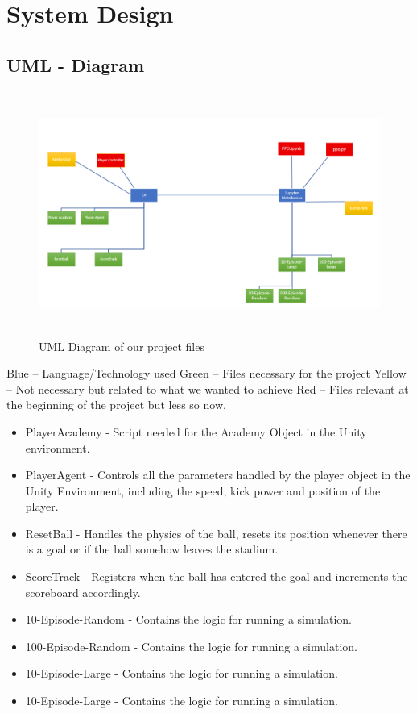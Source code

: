 
\chapter{System Design}

\section{UML - Diagram}

\begin{figure}[H]
    \centering
    \includegraphics[width=130mm, height=80mm]{img/UML.PNG}
    \caption{UML Diagram of our project files}
    \label{fig:uml}
\end{figure}

Blue – Language/Technology used \newline
Green – Files necessary for the project \newline
Yellow – Not necessary but related to what we wanted to achieve \newline
Red – Files relevant at the beginning of the project but less so now. \newline

\begin{itemize}
    \item PlayerAcademy - Script needed for the Academy Object in the Unity environment.
    \item PlayerAgent - Controls all the parameters handled by the player object in the Unity Environment, including the speed, kick power and position of the player.
    \item ResetBall - Handles the physics of the ball, resets its position whenever there is a goal or if the ball somehow leaves the stadium.
    \item ScoreTrack - Registers when the ball has entered the goal and increments the scoreboard accordingly.
    \item 10-Episode-Random - Contains the logic for running a simulation.
    \item 100-Episode-Random - Contains the logic for running a simulation.
    \item 10-Episode-Large - Contains the logic for running a simulation.
    \item 10-Episode-Large - Contains the logic for running a simulation.
\end{itemize}

